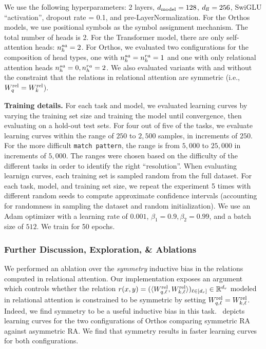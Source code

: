 We use the following hyperparameters: 2 layers, $d_{\mathrm{model}} = 128$, $d_{\mathrm{ff}} = 256$, SwiGLU ``activation'', dropout rate = 0.1, and pre-LayerNormalization. For the Orthos models, we use positional symbols as the symbol assignment mechanism. The total number of heads is 2. For the Transformer model, there are only self-attention heads: $n_h^{sa} = 2$. For Orthos, we evaluated two configurations for the composition of head types, one with $n_h^{sa} = n_h^{ra} = 1$ and one with only relational attention heads $n_h^{sa} = 0, n_h^{ra} = 2$. We also evaluated variants with and without the constraint that the relations in relational attention are symmetric (i.e., $W_q^{\mathrm{rel}} = W_k^{\mathrm{rel}}$).

\textbf{Training details.} For each task and model, we evaluated learning curves by varying the training set size and training the model until convergence, then evaluating on a hold-out test sets. For four out of five of the tasks, we evaluate learning curves within the range of $250$ to $2,500$ samples, in increments of $250$. For the more difficult \texttt{match pattern}, the range is from $5,000$ to $25,000$ in increments of $5,000$. The ranges were chosen based on the difficulty of the different tasks in order to identify the right ``resolution''. When evaluating learnign curves, each training set is sampled random from the full dataset. For each task, model, and training set size, we repeat the experiment 5 times with different random seeds to compute approximate confidence intervals (accounting for randomness in sampling the dataset and random initialization). We use an Adam optimizer with a learning rate of $0.001$, $\beta_1 = 0.9, \beta_2 = 0.99$, and a batch size of $512$. We train for 50 epochs.

\subsubsection*{Further Discussion, Exploration, \& Ablations}

We performed an ablation over the \textit{symmetry} inductive bias in the relations computed in relational attention. Our implementation exposes an argument which controls whether the relation $r(x, y) = (\langle W_{q, \ell}^{\mathrm{rel}}, W_{k, \ell}^{\mathrm{rel}} \rangle)_{\ell \in [d_r]} \in \mathbb{R}^{d_r}$ modeled in relational attention is constrained to be symmetric by setting $W_{q, \ell}^{\mathrm{rel}} = W_{k, \ell}^{\mathrm{rel}}$. Indeed, we find symmetry to be a useful inductive bias in this task.~ depicts learning curves for the two configurations of Orthos comparing symmetric RA against asymmetric RA. We find that symmetry results in faster learning curves for both configurations.

